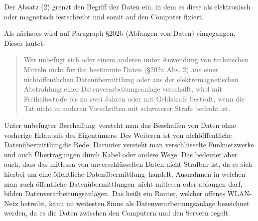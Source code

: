 \documentclass[10pt,a4paper]{article}
\begin{document}
Der Absatz (2) grenzt den Begriff der Daten ein, in dem es diese als elektronisch oder magnetisch festschreibt und somit auf den Computer fixiert. 

Als nächstes wird auf Paragraph §202b (Abfangen von Daten) eingegangen. Dieser lautet:
\begin{quote}
Wer unbefugt sich oder einem anderen unter Anwendung von technischen Mitteln nicht für ihn bestimmte Daten (§202a Abs. 2) aus einer nichtöffentlichen Datenübermittlung oder aus der elektromagnetischen Abstrahlung einer Datenverarbeitungsanlage verschafft, wird mit Freiheitsstrafe bis zu zwei Jahren oder mit Geldstrafe bestraft, wenn die Tat nicht in anderen Vorschriften mit schwererer Strafe bedroht ist.
\end{quote}
Unter \glqq unbefugter Beschaffung\grqq \ versteht man das Beschaffen von Daten ohne vorherige Erlaubnis des Eigentümers. Des Weiteren ist von \glqq nichtöffentliche Datenübermittlung\grqq die Rede. Darunter versteht man verschlüsselte Funknetzwerke und auch Übertragungen durch Kabel oder andere Wege. Das bedeutet aber auch, dass das mitlesen von unverschlüsselten Daten nicht Strafbar ist, da es sich hierbei um eine \glqq öffentliche Datenübermittlung\grqq \ handelt. Ausnahmen in welchen man auch \glqq öffentliche Datenübermittlungen\grqq \  nicht mitlesen oder abfangen darf, bilden Datenverarbeitungsanlagen. Das heißt ein Router, welcher offenes WLAN-Netz betreibt, kann im weitesten Sinne als Datenverarbeitungsanlage bezeichnet werden, da es die Daten zwischen den Computern und den Servern regelt.
\end{document}
